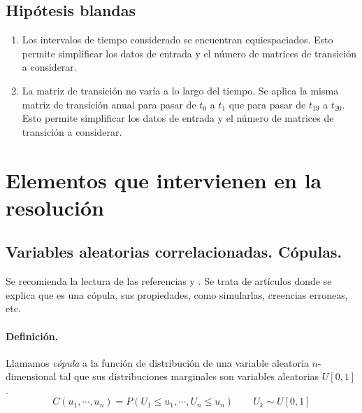 \subsection{Hip\'otesis blandas}
\begin{enumerate}
\item Los intervalos de tiempo considerado se encuentran equiespaciados. Esto 
permite simplificar los datos de entrada y el n\'umero de matrices de 
transici\'on a considerar.
\item La matriz de transici\'on no var\'ia a lo largo del tiempo. Se aplica 
la misma matriz de transici\'on anual para pasar de $t_0$ a $t_1$ que para 
pasar de $t_{19}$ a $t_{20}$. Esto permite simplificar los datos de entrada y 
el n\'umero de matrices de transici\'on a considerar.
\end{enumerate}


\section{Elementos que intervienen en la resoluci\'on}

\subsection{Variables aleatorias correlacionadas. C\'opulas.}

Se recomienda la lectura de las referencias \cite{copu:wang} y 
\cite{copu:pitfalls}. Se trata de art\'iculos donde se explica que es una 
c\'opula, sus propiedades, como simularlas, creencias erroneas, etc.

\paragraph{Definici\'on.} Llamamos \emph{c\'opula} a la funci\'on
de distribuci\'on de una variable aleatoria $n$-dimensional tal que sus distribuciones
marginales  son variables aleatorias $U[0,1]$.
\begin{displaymath}
C(u_1, \cdots,u_n)=P(U_1 \leq u_1, \cdots, U_n \leq u_n) \qquad U_k \sim U[0,1]
\end{displaymath}

